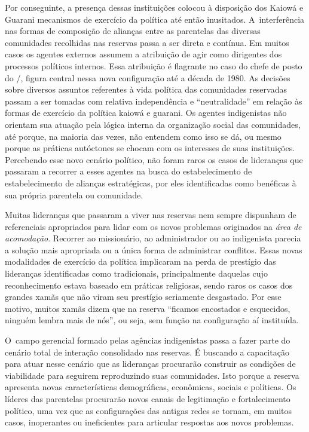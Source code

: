 Por conseguinte, a presença dessas instituições colocou à disposição dos
Kaiowá e Guarani mecanismos de exercício da política até então
inusitados. A~interferência nas formas de composição de alianças entre
as parentelas das diversas comunidades recolhidas nas reservas passa a
ser direta e contínua. Em muitos casos os agentes externos assumem a
atribuição de agir como dirigentes dos processos políticos internos.
Essa atribuição é flagrante no caso do chefe de posto do /,
figura central nessa nova configuração até a década de 1980. As
decisões sobre diversos assuntos referentes à vida política das
comunidades reservadas passam a ser tomadas com relativa independência
e ``neutralidade'' em relação às formas de exercício da política kaiowá e
guarani. Os agentes indigenistas não orientam sua atuação pela lógica
interna da organização social das comunidades, até porque, na maioria
das vezes, não entendem como isso se dá, ou mesmo porque as práticas
autóctones se chocam com os interesses de suas instituições. Percebendo
esse novo cenário político, não foram raros os casos de lideranças que
passaram a recorrer a esses agentes na busca do estabelecimento de estabelecimento de alianças
estratégicas, por eles identificadas como benéficas à sua própria
parentela ou comunidade.

Muitas lideranças que passaram a viver nas reservas nem sempre dispunham
de referenciais apropriados para lidar com os novos problemas
originados na \emph{área de acomodação}. Recorrer ao missionário, ao
administrador ou ao indigenista parecia a solução mais apropriada ou a
única forma de administrar conflitos. Essas novas modalidades de
exercício da política implicaram na perda de prestígio das lideranças
identificadas como tradicionais, principalmente daquelas cujo
reconhecimento estava baseado em práticas religiosas, sendo raros os
casos dos grandes xamãs que não viram seu prestígio seriamente
desgastado. Por esse motivo, muitos xamãs dizem que na reserva ``ficamos
encostados e esquecidos, ninguém lembra mais de nós'', ou seja, sem
função na configuração aí instituída.

O~campo gerencial formado pelas agências indigenistas passa a fazer
parte do cenário total de interação consolidado nas reservas. É
buscando a capacitação para atuar nesse cenário que as lideranças
procurarão construir as condições de viabilidade para seguirem
reproduzindo suas comunidades. Isto porque a reserva apresenta novas
características demográficas, econômicas, sociais e políticas. Os
líderes das parentelas procurarão novos canais de legitimação e
fortalecimento político, uma vez que as configurações das antigas redes
se tornam, em muitos casos, inoperantes ou ineficientes para articular
respostas aos novos problemas. 

